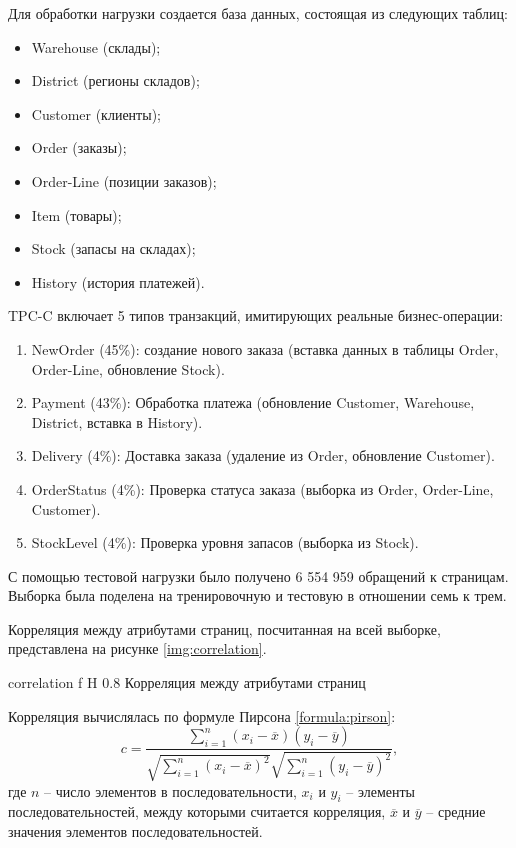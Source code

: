 Для обработки нагрузки создается база данных, состоящая из следующих таблиц:
\begin{itemize}
	\item Warehouse (склады);
	\item District (регионы складов);
	\item Customer (клиенты);
	\item Order (заказы);
	\item Order-Line (позиции заказов);
	\item Item (товары);
	\item Stock (запасы на складах);
	\item History (история платежей).
\end{itemize}

TPC-C включает 5 типов транзакций, имитирующих реальные бизнес-операции:
\begin{enumerate}
	\item NewOrder (45\%): создание нового заказа (вставка данных в таблицы Order, Order-Line, обновление Stock).
	\item Payment (43\%): Обработка платежа (обновление Customer, Warehouse, District, вставка в History).
	\item Delivery (4\%): Доставка заказа (удаление из Order, обновление Customer).
	\item OrderStatus (4\%): Проверка статуса заказа (выборка из Order, Order-Line, Customer).
	\item StockLevel (4\%): Проверка уровня запасов (выборка из Stock).
\end{enumerate}

С помощью тестовой нагрузки было получено 6 554 959 обращений к страницам.
Выборка была поделена на тренировочную и тестовую в отношении семь к трем.

Корреляция между атрибутами страниц, посчитанная на всей выборке, представлена на рисунке \ref{img:correlation}.

{correlation} %
{f} %
{H} %
{0.8\textwidth} %
{Корреляция между атрибутами страниц} %

Корреляция вычислялась по формуле Пирсона \ref{formula:pirson}:
\begin{equation}\label{formula:pirson}
	c = \frac{\sum\limits_{i=1}^{n} (x_i - \overline{x}) (y_i - \overline{y})}{\sqrt{\sum\limits_{i=1}^{n}(x_i - \overline{x})^2} \sqrt{\sum\limits_{i=1}^{n}(y_i - \overline{y})^2}},
\end{equation}
где $n$ -- число элементов в последовательности, $x_i$ и $y_i$ -- элементы последовательностей, между которыми считается корреляция, $\overline{x}$ и $\overline{y}$ -- средние значения элементов последовательностей.

